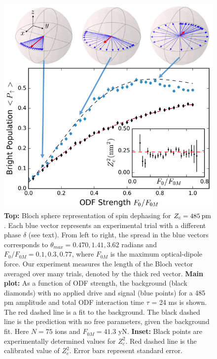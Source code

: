 \documentclass[aps,prl,twocolumn,superscriptaddress,floatfix]{revtex4-1}
\begin{document}
\begin{figure}
    \centering
    \includegraphics[width=\columnwidth]{odf_strength_bloch}
  \caption{\textbf{Top:} Bloch sphere representation \citep{QuTip} of spin dephasing for $Z_{c} = 485\: \rm{pm}$. Each blue vector represents an experimental trial with a different phase $\delta$ (see text). From left to right, the spread in the blue vectors corresponds to $\theta_{max} = 0.470, 1.41, 3.62$ radians and $F_{0}/F_{0M} = 0.1,0.3,0.77$, where $F_{0M}$ is the maximum optical-dipole force. Our experiment measures the length of the Bloch vector averaged over many trials, denoted by the thick red vector. \textbf{Main plot:} As a function of ODF strength, the background (black diamonds) with no applied drive and signal (blue points) for a 485 pm amplitude and total ODF interaction time $\tau$ = 24 ms is shown. The red dashed line is a fit to the background. The black dashed line is the prediction with no free parameters, given the background fit. Here $N = 75$ ions and $F_{0M} = 41.3$ yN. \textbf{Inset:} Black points are experimentally determined values for $Z_{c}^2$. Red dashed line is the calibrated value of $Z_{c}^{2}$. Error bars represent standard error.}\label{Meas_stren}
\end{figure}
\end{document}

